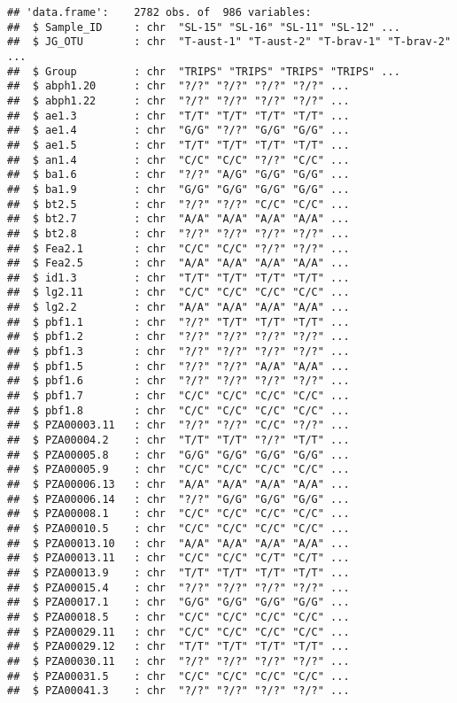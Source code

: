 \documentclass[
]{article}
\begin{document}
\begin{verbatim}
## 'data.frame':    2782 obs. of  986 variables:
##  $ Sample_ID     : chr  "SL-15" "SL-16" "SL-11" "SL-12" ...
##  $ JG_OTU        : chr  "T-aust-1" "T-aust-2" "T-brav-1" "T-brav-2" ...
##  $ Group         : chr  "TRIPS" "TRIPS" "TRIPS" "TRIPS" ...
##  $ abph1.20      : chr  "?/?" "?/?" "?/?" "?/?" ...
##  $ abph1.22      : chr  "?/?" "?/?" "?/?" "?/?" ...
##  $ ae1.3         : chr  "T/T" "T/T" "T/T" "T/T" ...
##  $ ae1.4         : chr  "G/G" "?/?" "G/G" "G/G" ...
##  $ ae1.5         : chr  "T/T" "T/T" "T/T" "T/T" ...
##  $ an1.4         : chr  "C/C" "C/C" "?/?" "C/C" ...
##  $ ba1.6         : chr  "?/?" "A/G" "G/G" "G/G" ...
##  $ ba1.9         : chr  "G/G" "G/G" "G/G" "G/G" ...
##  $ bt2.5         : chr  "?/?" "?/?" "C/C" "C/C" ...
##  $ bt2.7         : chr  "A/A" "A/A" "A/A" "A/A" ...
##  $ bt2.8         : chr  "?/?" "?/?" "?/?" "?/?" ...
##  $ Fea2.1        : chr  "C/C" "C/C" "?/?" "?/?" ...
##  $ Fea2.5        : chr  "A/A" "A/A" "A/A" "A/A" ...
##  $ id1.3         : chr  "T/T" "T/T" "T/T" "T/T" ...
##  $ lg2.11        : chr  "C/C" "C/C" "C/C" "C/C" ...
##  $ lg2.2         : chr  "A/A" "A/A" "A/A" "A/A" ...
##  $ pbf1.1        : chr  "?/?" "T/T" "T/T" "T/T" ...
##  $ pbf1.2        : chr  "?/?" "?/?" "?/?" "?/?" ...
##  $ pbf1.3        : chr  "?/?" "?/?" "?/?" "?/?" ...
##  $ pbf1.5        : chr  "?/?" "?/?" "A/A" "A/A" ...
##  $ pbf1.6        : chr  "?/?" "?/?" "?/?" "?/?" ...
##  $ pbf1.7        : chr  "C/C" "C/C" "C/C" "C/C" ...
##  $ pbf1.8        : chr  "C/C" "C/C" "C/C" "C/C" ...
##  $ PZA00003.11   : chr  "?/?" "?/?" "C/C" "?/?" ...
##  $ PZA00004.2    : chr  "T/T" "T/T" "?/?" "T/T" ...
##  $ PZA00005.8    : chr  "G/G" "G/G" "G/G" "G/G" ...
##  $ PZA00005.9    : chr  "C/C" "C/C" "C/C" "C/C" ...
##  $ PZA00006.13   : chr  "A/A" "A/A" "A/A" "A/A" ...
##  $ PZA00006.14   : chr  "?/?" "G/G" "G/G" "G/G" ...
##  $ PZA00008.1    : chr  "C/C" "C/C" "C/C" "C/C" ...
##  $ PZA00010.5    : chr  "C/C" "C/C" "C/C" "C/C" ...
##  $ PZA00013.10   : chr  "A/A" "A/A" "A/A" "A/A" ...
##  $ PZA00013.11   : chr  "C/C" "C/C" "C/T" "C/T" ...
##  $ PZA00013.9    : chr  "T/T" "T/T" "T/T" "T/T" ...
##  $ PZA00015.4    : chr  "?/?" "?/?" "?/?" "?/?" ...
##  $ PZA00017.1    : chr  "G/G" "G/G" "G/G" "G/G" ...
##  $ PZA00018.5    : chr  "C/C" "C/C" "C/C" "C/C" ...
##  $ PZA00029.11   : chr  "C/C" "C/C" "C/C" "C/C" ...
##  $ PZA00029.12   : chr  "T/T" "T/T" "T/T" "T/T" ...
##  $ PZA00030.11   : chr  "?/?" "?/?" "?/?" "?/?" ...
##  $ PZA00031.5    : chr  "C/C" "C/C" "C/C" "C/C" ...
##  $ PZA00041.3    : chr  "?/?" "?/?" "?/?" "?/?" ...

\end{verbatim}
\end{document}
